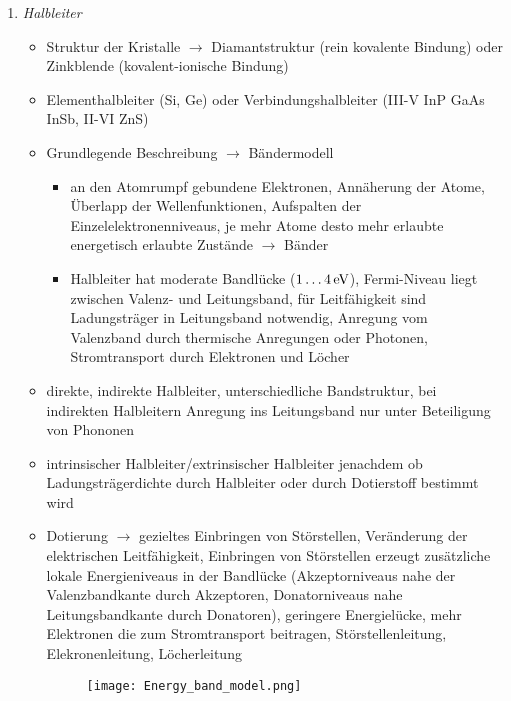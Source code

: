 \documentclass[11pt,a4paper]{article}
\begin{document}
\pagestyle{empty}

\begin{enumerate}
	
	\item \emph{Halbleiter}
	
	\begin{itemize}
		
		\item 	Struktur der Kristalle $\rightarrow$ Diamantstruktur (rein kovalente Bindung) oder Zinkblende (kovalent-ionische Bindung)
		
		\item Elementhalbleiter (Si, Ge) oder Verbindungshalbleiter (III-V InP GaAs InSb, II-VI ZnS)
		
		\item Grundlegende Beschreibung $\rightarrow$ Bändermodell
		\begin{itemize}
			
			\item an den Atomrumpf gebundene Elektronen, Annäherung der Atome, Überlapp der Wellenfunktionen, Aufspalten der Einzelelektronenniveaus, je mehr Atome desto mehr erlaubte energetisch erlaubte Zustände $\rightarrow$ Bänder
			
			\item Halbleiter hat moderate Bandlücke ($\unit[1 \dots 4]{eV}$), Fermi-Niveau liegt zwischen Valenz- und Leitungsband, für Leitfähigkeit sind Ladungsträger in Leitungsband notwendig, Anregung vom Valenzband durch thermische Anregungen oder Photonen, Stromtransport durch Elektronen und Löcher
			
		\end{itemize} 
			
			\item direkte, indirekte Halbleiter, unterschiedliche Bandstruktur, bei indirekten Halbleitern Anregung ins Leitungsband nur unter Beteiligung von Phononen
		
			\item intrinsischer Halbleiter/extrinsischer Halbleiter jenachdem ob Ladungsträgerdichte durch Halbleiter oder durch Dotierstoff bestimmt wird
			
			\item Dotierung $\rightarrow$ gezieltes Einbringen von Störstellen, Veränderung der elektrischen Leitfähigkeit, Einbringen von Störstellen erzeugt zusätzliche lokale Energieniveaus in der Bandlücke (Akzeptorniveaus nahe der Valenzbandkante durch Akzeptoren, Donatorniveaus nahe Leitungsbandkante durch Donatoren), geringere Energielücke, mehr Elektronen die zum Stromtransport beitragen, Störstellenleitung, Elekronenleitung, Löcherleitung	
		\begin{figure}[H]
			\centering
			\texttt{[image: Energy\_band\_model.png]}
		\end{figure}
					

\end{itemize}
\end{enumerate}
\end{document}
